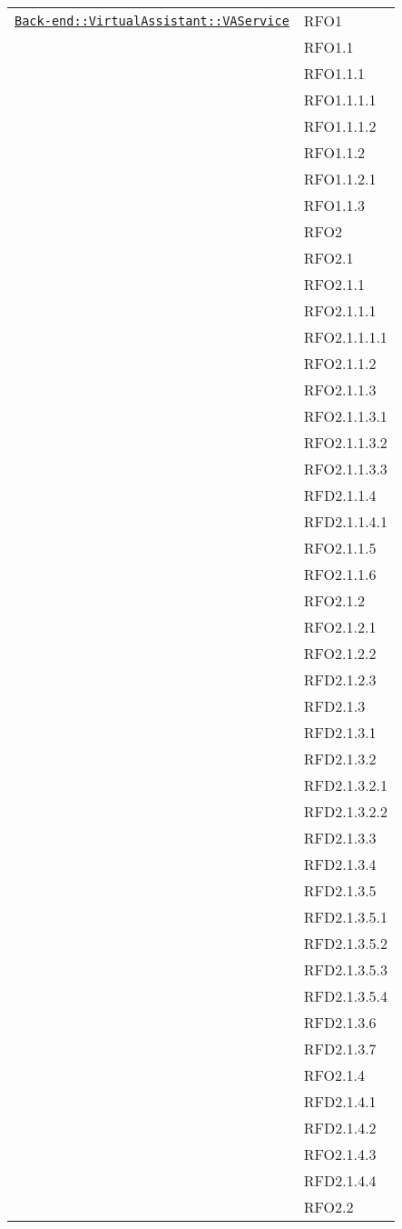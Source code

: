\begin{longtable}{|>{\centering}m{10cm}|m{3cm}<{\centering}|}
\hyperref[Back-end::VirtualAssistant::VAService]{\texttt{Back-end::VirtualAssistant::VAService}} & RFO1\\
& RFO1.1\\
& RFO1.1.1\\
& RFO1.1.1.1\\
& RFO1.1.1.2\\
& RFO1.1.2\\
& RFO1.1.2.1\\
& RFO1.1.3\\
& RFO2\\
& RFO2.1\\
& RFO2.1.1\\
& RFO2.1.1.1\\
& RFO2.1.1.1.1\\
& RFO2.1.1.2\\
& RFO2.1.1.3\\
& RFO2.1.1.3.1\\
& RFO2.1.1.3.2\\
& RFO2.1.1.3.3\\
& RFD2.1.1.4\\
& RFD2.1.1.4.1\\
& RFO2.1.1.5\\
& RFO2.1.1.6\\
& RFO2.1.2\\
& RFO2.1.2.1\\
& RFO2.1.2.2\\
& RFD2.1.2.3\\
& RFD2.1.3\\
& RFD2.1.3.1\\
& RFD2.1.3.2\\
& RFD2.1.3.2.1\\
& RFD2.1.3.2.2\\
& RFD2.1.3.3\\
& RFD2.1.3.4\\
& RFD2.1.3.5\\
& RFD2.1.3.5.1\\
& RFD2.1.3.5.2\\
& RFD2.1.3.5.3\\
& RFD2.1.3.5.4\\
& RFD2.1.3.6\\
& RFD2.1.3.7\\
& RFO2.1.4\\
& RFD2.1.4.1\\
& RFD2.1.4.2\\
& RFO2.1.4.3\\
& RFD2.1.4.4\\
& RFO2.2\\

\end{longtable}
